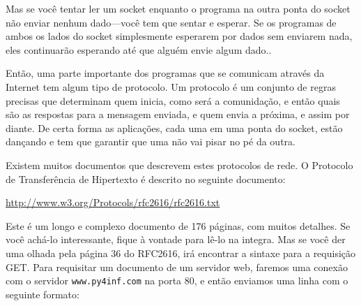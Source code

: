 Mas se você tentar ler um socket enquanto o programa na outra ponta do
socket não enviar nenhum dado---você tem que sentar e esperar.  Se os
programas de ambos os lados do socket simplesmente esperarem por dados sem
enviarem nada, eles continuarão esperando até que alguém envie algum dado..

Então, uma parte importante dos programas que se comunicam através da Internet
tem algum tipo de protocolo.  Um protocolo é um conjunto de regras precisas
que determinam quem inicia, como será a comunidação, e então quais são as
respostas para a mensagem enviada, e quem envia a próxima, e assim por diante.
De certa forma as aplicações, cada uma em uma ponta do socket, estão dançando e
tem que garantir que uma não vai pisar no pé da outra.

Existem muitos documentos que descrevem estes protocolos de rede. O Protocolo
de Transferência de Hipertexto é descrito no seguinte documento:

\url{http://www.w3.org/Protocols/rfc2616/rfc2616.txt}

Este é um longo e complexo documento de 176 páginas, com muitos detalhes.  Se
você achá-lo interessante, fique à vontade para lê-lo na integra.  Mas se
você der uma olhada pela página 36 do RFC2616, irá encontrar a sintaxe
para a requisição GET. Para requisitar um documento de um servidor web, faremos
uma conexão com o servidor {\tt www.py4inf.com} na porta 80, e então
enviamos uma linha com o seguinte formato:

